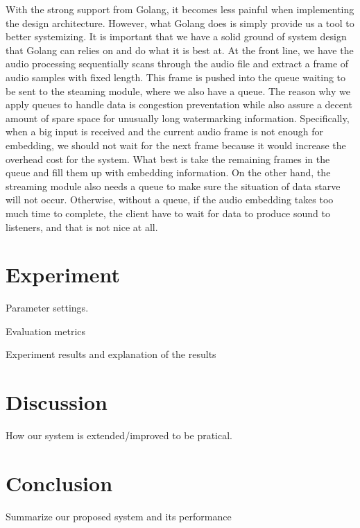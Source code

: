 \documentclass[conference]{IEEEtran}
\begin{document}
With the strong support from Golang, it becomes less painful when implementing the design architecture. However, what Golang does is simply provide us a tool to better systemizing. It is important that we have a solid ground of system design that Golang can relies on and do what it is best at. At the front line, we have the audio processing sequentially scans through the audio file and extract a frame of audio samples with fixed length. This frame is pushed into the queue waiting to be sent to the steaming module, where we also have a queue. The reason why we apply queues to handle data is congestion preventation while also assure a decent amount of spare space for unusually long watermarking information. Specifically, when a big input is received and the current audio frame is not enough for embedding, we should not wait for the next frame because it would increase the overhead cost for the system. What best is take the remaining frames in the queue and fill them up with embedding information. On the other hand, the streaming module also needs a queue to make sure the situation of data starve will not occur. Otherwise, without a queue, if the audio embedding takes too much time to complete, the client have to wait for data to produce sound to listeners, and that is not nice at all. 

\section{Experiment}
 
Parameter settings. 

Evaluation metrics

Experiment results and explanation of the results
\section{Discussion}

How our system is extended/improved to be pratical.

\section{Conclusion}

Summarize our proposed system and its performance



\end{document}
